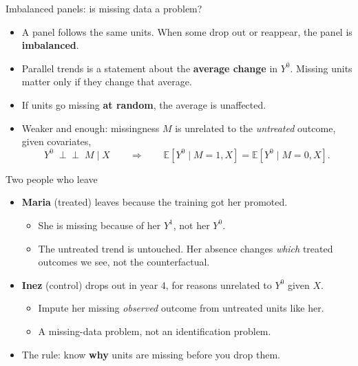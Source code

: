 \documentclass[
  11pt,
  ignorenonframetext,
  aspectratio=169,
]{beamer}
\providecommand{\tightlist}{%
  \setlength{\itemsep}{0pt}\setlength{\parskip}{0pt}}
\newcommand{\indep}{\perp\!\!\!\perp}
\begin{document}
\begin{frame}{Imbalanced panels: is missing data a problem?}
\protect{}\label{imbalanced-panels-is-missing-data-a-problem}
\begin{itemize}
\tightlist
\item
  A panel follows the same units. When some drop out or reappear, the
  panel is \textbf{imbalanced}.
\item
  Parallel trends is a statement about the \textbf{average change} in
  \(Y^0\). Missing units matter only if they change that average.
\item
  If units go missing \textbf{at random}, the average is unaffected.
\item
  Weaker and enough: missingness \(M\) is unrelated to the
  \emph{untreated} outcome, given covariates, \[
  Y^0 \;\indep\; M \mid X \qquad\Longrightarrow\qquad \mathbb{E}[Y^0 \mid M=1, X] = \mathbb{E}[Y^0 \mid M=0, X].
  \]
\end{itemize}
\end{frame}

\begin{frame}{Two people who leave}
\protect{}\label{two-people-who-leave}
\begin{itemize}
\tightlist
\item
  \textbf{Maria} (treated) leaves because the training got her promoted.

  \begin{itemize}
  \tightlist
  \item
    She is missing because of her \(Y^1\), not her \(Y^0\).
  \item
    The untreated trend is untouched. Her absence changes \emph{which}
    treated outcomes we see, not the counterfactual.
  \end{itemize}
\item
  \textbf{Inez} (control) drops out in year 4, for reasons unrelated to
  \(Y^0\) given \(X\).

  \begin{itemize}
  \tightlist
  \item
    Impute her missing \emph{observed} outcome from untreated units like
    her.
  \item
    A missing-data problem, not an identification problem.
  \end{itemize}
\end{itemize}

\vspace{0.4em}

\begin{itemize}
\tightlist
\item
  The rule: know \textbf{why} units are missing before you drop them.
\end{itemize}
\end{frame}
\end{document}
